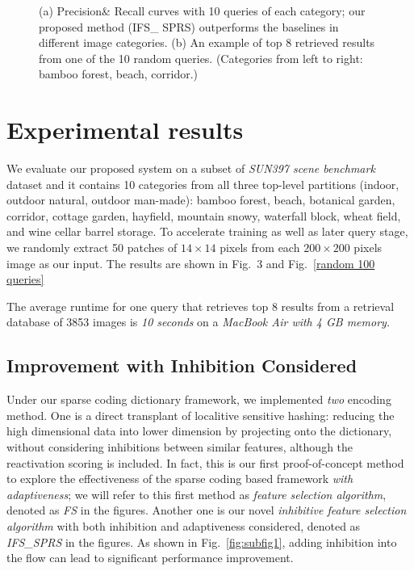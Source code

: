 \documentclass[letterpaper]{article}
\begin{document}
\begin{figure}[!ht]
\label{The-result-of-the-retrieval}
\caption{(a) Precision\& Recall curves with 10 queries of each category; our proposed method (IFS\_ SPRS) outperforms the baselines in different image categories. (b) An example of top 8 retrieved results from one of the 10 random queries. (Categories from left to right: bamboo forest, beach, corridor.)}
\end{figure}

\section{Experimental results}
We evaluate our proposed system on a subset of \emph{SUN397 scene benchmark} dataset and it contains 10 categories from all three top-level partitions (indoor, outdoor natural, outdoor man-made): bamboo forest, beach, botanical garden, corridor, cottage garden, hayfield, mountain snowy, waterfall block, wheat field, and wine cellar barrel storage. To accelerate training as well as later query stage, we randomly extract 50 patches of $14\times14$ pixels from each $200\times200$ pixels image as our input. The results are shown in Fig.~3 and Fig.~\ref{random 100 queries}

The average runtime for one query that retrieves top 8 results from a retrieval database of 3853 images is \emph{10 seconds} on a \emph{MacBook Air with 4 GB memory.}

\subsection{Improvement with Inhibition Considered}
Under our sparse coding dictionary framework, we implemented \emph{two} encoding method. One is a direct transplant of localitive sensitive hashing: reducing the high dimensional data into lower dimension by projecting onto the dictionary, without considering inhibitions between similar features, although the reactivation scoring is included. In fact, this is our first proof-of-concept method to explore the effectiveness of the sparse coding based framework \emph{with adaptiveness}; we will refer to this first method as \emph{feature selection algorithm}, denoted as \emph{FS} in the figures. Another one is our novel \emph{inhibitive feature selection algorithm} with both inhibition and adaptiveness considered, denoted as \emph{IFS\_SPRS} in the figures. As shown in Fig.~\ref{fig:subfig1}, adding inhibition into the flow can lead to significant performance improvement.
\end{document}
